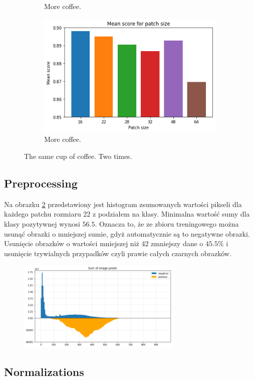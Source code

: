 \begin{figure}[h!]
\begin{subfigure}[b]{0.45\linewidth}
    \caption{More coffee.}
  \end{subfigure}
  \begin{subfigure}[b]{0.45\linewidth}
    \includegraphics[width=\linewidth]{images/patch_score}
    \caption{More coffee.}
  \end{subfigure}
  \caption{The same cup of coffee. Two times.}
  \label{fig:supervised_patches}
\end{figure}

\subsection{Preprocessing}

Na obrazku \ref{fig:pixel_sums} przedstawiony jest histogram zsumowanych wartości pikseli dla każdego patchu rozmiaru 22 z podziałem na klasy. Minimalna wartość sumy dla klasy pozytywnej wynosi $56.5$. Oznacza to, że ze zbioru treningowego można usunąć obrazki o mniejszej sumie, gdyż automatycznie są to negatywne obrazki. Usunięcie obrazków o wartości mniejszej niż 42 zmniejszy dane o $45.5\%$ i usunięcie trywialnych przypadków czyli prawie całych czarnych obrazków.

\begin{figure}[h!]
    \centering
    \includegraphics[width=0.7\textwidth]{images/pixel_sums}
    \caption{}
    \label{fig:pixel_sums}
\end{figure}

\subsection{Normalizations}



